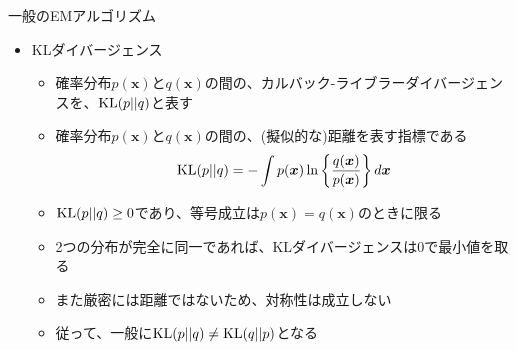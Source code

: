 \documentclass[dvipdfmx,notheorems,t]{beamer}
\begin{document}
\begin{frame}{一般のEMアルゴリズム}
\begin{itemize}
	\framebreak
	
	\item KLダイバージェンス
	\begin{itemize}
		\item 確率分布$p(\bm{x})$と$q(\bm{x})$の間の、カルバック-ライブラーダイバージェンスを、$\operatorname{KL} (p || q)$と表す
		\item 確率分布$p(\bm{x})$と$q(\bm{x})$の間の、(擬似的な)\alert{距離}を表す指標である
		\begin{equation}
			\operatorname{KL} (p || q) = -\int p(\bm{x}) \ln \left\{ \frac{q(\bm{x})}{p(\bm{x})} \right\} d\bm{x}
		\end{equation}
		
		\item $\operatorname{KL} (p || q) \ge 0$であり、等号成立は$p(\bm{x}) = q(\bm{x})$のときに限る
		\item 2つの分布が完全に同一であれば、KLダイバージェンスは$0$で最小値を取る
		\newline
		\item また厳密には距離ではないため、対称性は成立しない
		\item 従って、一般に$\operatorname{KL} (p || q) \neq \operatorname{KL} (q || p)$となる
	\end{itemize}
\end{itemize}

\end{frame}
\end{document}

